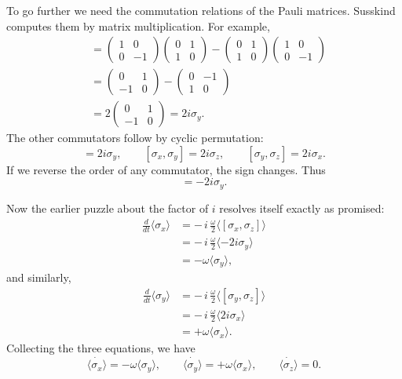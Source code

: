 To go further we need the commutation relations of the Pauli matrices. Susskind computes them by matrix multiplication. For example,
\begin{align}
[\sigma_z,\sigma_x]
&=
\begin{pmatrix}
1&0\\
0&-1
\end{pmatrix}
\begin{pmatrix}
0&1\\
1&0
\end{pmatrix}
-
\begin{pmatrix}
0&1\\
1&0
\end{pmatrix}
\begin{pmatrix}
1&0\\
0&-1
\end{pmatrix} \\
&=
\begin{pmatrix}
0&1\\
-1&0
\end{pmatrix}
-
\begin{pmatrix}
0&-1\\
1&0
\end{pmatrix} \\
&=
2
\begin{pmatrix}
0&1\\
-1&0
\end{pmatrix}
=
2i\sigma_y.
\end{align}
The other commutators follow by cyclic permutation:
\begin{equation}
[\sigma_z,\sigma_x]=2i\sigma_y,
\qquad
[\sigma_x,\sigma_y]=2i\sigma_z,
\qquad
[\sigma_y,\sigma_z]=2i\sigma_x.
\end{equation}
If we reverse the order of any commutator, the sign changes. Thus
\begin{equation}
[\sigma_x,\sigma_z]=-2i\sigma_y.
\end{equation}

Now the earlier puzzle about the factor of \(i\) resolves itself exactly as promised:
\begin{align}
\frac{d}{dt}\langle \sigma_x\rangle
&=
-\,i\,\frac{\omega}{2}\langle[\sigma_x,\sigma_z]\rangle \\
&=
-\,i\,\frac{\omega}{2}\langle-2i\sigma_y\rangle \\
&=
-\omega\langle \sigma_y\rangle,
\end{align}
and similarly,
\begin{align}
\frac{d}{dt}\langle \sigma_y\rangle
&=
-\,i\,\frac{\omega}{2}\langle[\sigma_y,\sigma_z]\rangle \\
&=
-\,i\,\frac{\omega}{2}\langle 2i\sigma_x\rangle \\
&=
+\omega\langle \sigma_x\rangle.
\end{align}
Collecting the three equations, we have
\begin{equation}
\dot{\langle \sigma_x\rangle}=-\omega\langle \sigma_y\rangle,
\qquad
\dot{\langle \sigma_y\rangle}=+\omega\langle \sigma_x\rangle,
\qquad
\dot{\langle \sigma_z\rangle}=0.
\end{equation}

